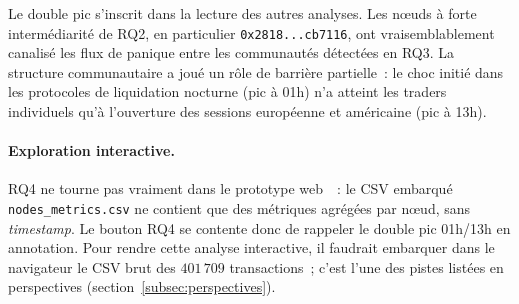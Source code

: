 Le double pic s'inscrit dans la lecture des autres analyses. Les n\oe{}uds \`a forte interm\'ediarit\'e de RQ2, en particulier \texttt{0x2818...cb7116}, ont vraisemblablement canalis\'e les flux de panique entre les communaut\'es d\'etect\'ees en RQ3. La structure communautaire a jou\'e un r\^ole de barri\`ere partielle~: le choc initi\'e dans les protocoles de liquidation nocturne (pic \`a 01h) n'a atteint les traders individuels qu'\`a l'ouverture des sessions europ\'eenne et am\'ericaine (pic \`a 13h).

\paragraph{Exploration interactive.}
RQ4 ne tourne pas vraiment dans le prototype web~\cite{cryptographexplorer_web}~:
le CSV embarqu\'e \texttt{nodes\_metrics.csv} ne contient que des
m\'etriques agr\'eg\'ees par n\oe{}ud, sans \textit{timestamp}. Le bouton
\og RQ4 \fg{} se contente donc de rappeler le double pic 01h/13h en
annotation. Pour rendre cette analyse interactive, il faudrait embarquer
dans le navigateur le CSV brut des $401\,709$ transactions~; c'est l'une
des pistes list\'ees en perspectives (section~\ref{subsec:perspectives}).
